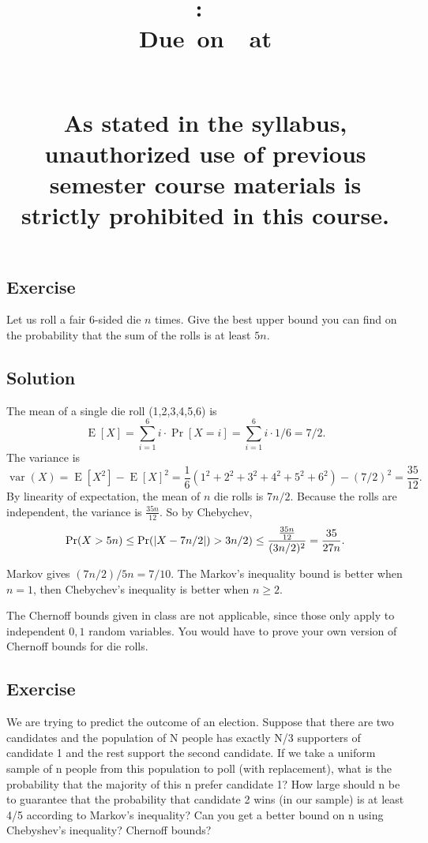 \documentclass{article}
\title{
    \vspace{2in}
    \textbf{\hmwkClass:\ \hmwkTitle}\\
    \normalsize\vspace{0.1in}\small{Due\ on\ \hmwkDueDate\ at \hmwkDueTime}\\
    \vspace{0.1in}\large{\textit{\hmwkClassInstructor\ \hmwkSection}} \\
    \vspace{0.8in}
    \begin{minipage}[t]{0.4\columnwidth}
        {\footnotesize\textbf{As stated in the syllabus, unauthorized use of previous semester course materials is strictly prohibited in this course.
        }}
    \vspace{0.5in}
    \end{minipage}
    \vspace{0.8in}
    \author{\textbf{\hmwkAuthorName}}
    \date{}
}
\newcounter{counter}
\newcommand{\Exercise}{Exercise \stepcounter{counter}\thecounter}
\newcommand{\Var}[1]{\operatorname{var}\left(#1\right)}
\newcommand{\E}[1]{\operatorname{E}\left[#1\right]}
\DeclarePairedDelimiter\abs{\lvert}{\rvert}%
\begin{document}
\maketitle
\pagebreak

\subsection*{\Exercise}
  Let us roll a fair 6-sided die $n$ times. Give the best upper bound you can find
  on the probability that the sum of the rolls is at least $5n$.

\subsection*{Solution}
  The mean of a single die roll (1,2,3,4,5,6) is
  $$\E{X}=\sum_{i=1}^6 i \cdot \Pr[X=i] =  \sum_{i=1}^6 i \cdot 1/6 = 7/2.$$ The variance  is $$\Var{X} = \E{X^2} - \E{X}^2 =
  \frac16 (1^2 + 2^2 + 3^2 + 4^2 + 5^2 + 6^2) - (7/2)^2 = 
  \frac{35}{12}.$$ By linearity of expectation, the mean of $n$ die rolls is
  $7n/2$. Because the rolls are independent, the variance is $\frac{35n}{12}$.
  So by Chebychev, $$\Pr(X > 5n) \leq \Pr(\abs{X - 7n/2}) > 3n/2) \leq
  \frac{\frac{35n}{12}}{(3n/2)^2} = \frac{35}{27n}.$$

    \vspace{3mm}
  Markov gives $(7n/2) / 5n = 7/10$. The Markov's inequality bound
  is better when $n=1$, then Chebychev's inequality is better when $n \geq 2$.

    \vspace{3mm}
  The Chernoff bounds given in class are not applicable, since those only
  apply to independent $0,1$ random variables. You would have to prove your
  own version of Chernoff bounds for die rolls.

\subsection*{\Exercise}
    We are trying to predict the outcome of an election. Suppose that there are
  two candidates and the population of N people has exactly N/3 supporters of
  candidate 1 and the rest support the second candidate. If we take a uniform
  sample of n people from this population to poll (with replacement), what is the probability
  that the majority of this n prefer candidate 1? How large should n be to
  guarantee that the probability that candidate 2 wins (in our sample) is at
  least 4/5 according to Markov's inequality? Can you get a better bound on n
  using Chebyshev's inequality? Chernoff bounds?
\end{document}
